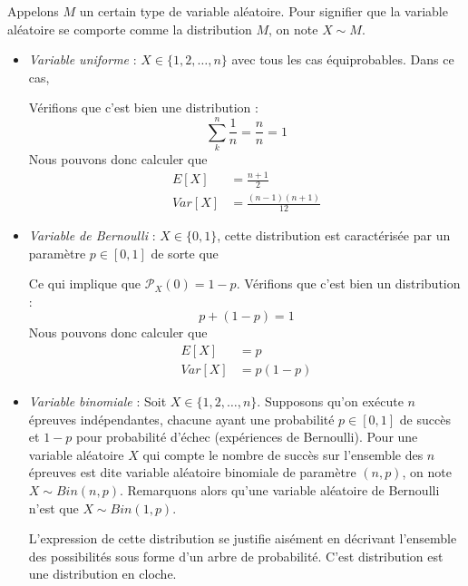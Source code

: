 \documentclass[a4paper,12pt]{report}
\theoremstyle{definition}
\renewcommand{\(}{\left(}
\renewcommand{\)}{\right)}
\renewcommand{\P}{\mathcal{P}}
\renewcommand{\d}{\textit}
\begin{document}
        Appelons $M$ un certain type de variable aléatoire. Pour signifier que la variable aléatoire se comporte comme la distribution $M$, on note $X \sim M$.
            \begin{itemize}[label = \textbullet]
                \item \d{Variable uniforme} : $X\in\{ 1,2,\dots,n \}$ avec tous les cas équiprobables. Dans ce cas,
                \begin{center}
                    \setlength{\fboxrule}{1pt}
                    \fbox{$\P_X(k) = \frac{1}{n}$}
                \end{center}
                Vérifions que c'est bien une distribution :
                $$\sum_k^n \frac{1}{n} = \frac{n}{n} = 1$$
                Nous pouvons donc calculer que
                \begin{align*}
                    E[X] &= \frac{n+1}{2} \\
                    Var[X] &= \frac{(n-1)(n+1)}{12}
                \end{align*}
                \item \d{Variable de Bernoulli} : $X\in\{ 0,1 \}$, cette distribution est caractérisée par un paramètre $p\in[0,1]$ de sorte que
                \begin{center}
                    \setlength{\fboxrule}{1pt}
                    \fbox{$\P_X(1) = p$}
                \end{center}
                Ce qui implique que $\P_X(0) = 1-p$. Vérifions que c'est bien un distribution :
                $$p+(1-p) = 1$$
                Nous pouvons donc calculer que
                \begin{align*}
                    E[X] &= p \\
                    Var[X] &= p(1-p)
                \end{align*}
                \item \d{Variable binomiale} : Soit $X\in\{ 1,2,\dots,n \}$. Supposons qu'on exécute $n$ épreuves indépendantes, chacune ayant une probabilité $p\in[0,1]$ de succès et $1-p$ pour probabilité d'échec (expériences de Bernoulli). Pour une variable aléatoire $X$ qui compte le nombre de succès sur l'ensemble des $n$ épreuves est dite variable aléatoire binomiale de paramètre $(n,p)$, on note $X\sim Bin(n,p)$. Remarquons alors qu'une variable aléatoire de Bernoulli n'est que $X \sim Bin(1,p)$.
                \begin{center}
                    \setlength{\fboxrule}{1pt}
                    \fbox{$\P_X(k) = {n\choose k} p^k(1-p)^{n-k}$}
                \end{center}
                L'expression de cette distribution se justifie aisément en décrivant l'ensemble des possibilités sous forme d'un arbre de probabilité. C'est distribution est une distribution en cloche.
                

\end{itemize}
\end{document}
